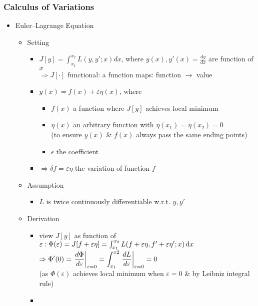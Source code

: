 \subsubsection{Calculus of Variations} \label{Math_Calc_VarCalc}
\begin{itemize}
\item Euler–Lagrange Equation
	\begin{itemize}
	\item Setting
		\begin{itemize}
		\item $\displaystyle J[y]=\int_{x_1}^{x_2}L(y, y';x)dx$, where $y(x), y'(x)=\frac{dy}{dx}$ are function of $x$ \\
		$\Rightarrow J[\cdot]$ functional: a function maps: function $\rightarrow$ value
		\item $y(x) = f(x) + \varepsilon \eta(x)$, where
			\begin{itemize}
			\item $f(x)$ a function where $J[y]$ achieves local minimum
			\item $\eta(x)$ an arbitrary function with $\eta(x_1)=\eta(x_2)=0$ \\
			(to ensure $y(x)$ \& $f(x)$ always pass the same ending points)
			\item $\epsilon$ the coefficient
			\end{itemize}
		\item $\Rightarrow \delta f = \varepsilon \eta$ the variation of function $f$
		\end{itemize}
	\item Assumption
		\begin{itemize}
		\item $L$ is twice continuously differentiable w.r.t. $y, y'$
		\end{itemize}
	\item Derivation
		\begin{itemize}
		\item view $J[y]$ as function of $\varepsilon: \Phi(\varepsilon) = J[f+\varepsilon\eta] = \int_{x_1}^{x_2}L(f+\varepsilon\eta, f'+\varepsilon\eta';x) \mathop{}\!\mathrm{d} x$ \\
		$\displaystyle \Rightarrow \Phi'(0) = \left.\frac{d\Phi}{d\varepsilon}\right|_{\varepsilon=0} = \int_{x_1}^{x2}\left.\frac{dL}{d\varepsilon}\right|_{\varepsilon=0} = 0$ \\
		(as $\Phi(\varepsilon)$ achieves local minimum when $\varepsilon=0$ \& by Leibniz integral rule)
		\item \abovedisplayskip=2pt\abovedisplayshortskip=2pt~\vspace*{-\baselineskip}

\end{itemize}
\end{itemize}
\end{itemize}
